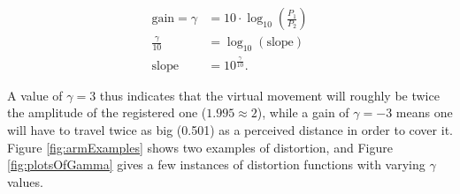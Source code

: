 \begin{align*}
    \text{gain} = \gamma &= 10 \cdot \log_{10} (\frac{P_1}{P_2})\\
    \frac{\gamma}{10} &= \log_{10} (\text{slope})\\
    \text{slope} &= 10^{\frac{\gamma}{10}}.
\end{align*}

\noindent
A value of $\gamma = 3$ thus indicates that the virtual movement will roughly be twice the amplitude of the registered one ($1.995 \approx 2$), while a gain of $\gamma = -3$ means one will have to travel twice as big (\num{0.501}) as a perceived distance in order to cover it. Figure \ref{fig:armExamples} shows two examples of distortion, and Figure \ref{fig:plotsOfGamma} gives a few instances of distortion functions with varying $\gamma $ values.

